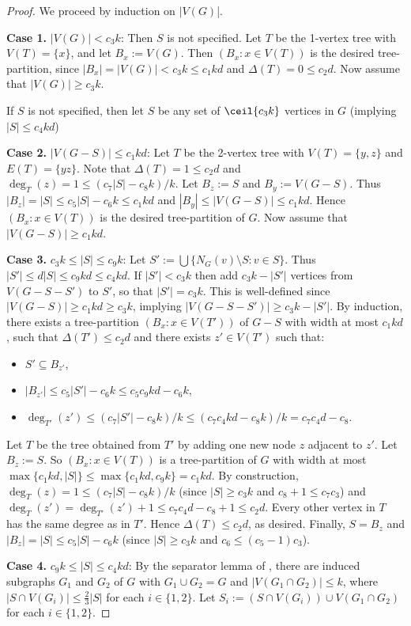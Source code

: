 \begin{proof}
We proceed by induction on $|V(G)$|.

\textbf{Case 1.} $|V(G)| < c_3 k$: Then $S$ is not specified. Let $T$ be the 1-vertex tree with $V(T)=\{x\}$, and let $B_x:=V(G)$. Then $(B_x:x\in V(T))$ is the desired tree-partition, since $|B_x|=|V(G)|<c_3 k \leq c_1 kd$ and $\Delta(T)=0\leq c_2d$. Now assume that $|V(G)| \geq c_3 k$. 

If $S$ is not specified, then let $S$ be any set of $\ceil{c_3k}$ vertices in $G$ (implying $|S|\leq c_4kd$)

\textbf{Case 2.} $|V(G-S)|\leq c_1kd$: Let $T$ be the 2-vertex tree with $V(T)=\{y,z\}$ and $E(T)=\{yz\}$. Note that $\Delta(T)=1\leq c_2 d$ and $\deg_T(z)=1\leq (c_7|S|-c_8k)/k$. Let $B_z:=S$ and $B_y:=V(G-S)$. Thus $|B_z|=|S|\leq c_5|S|-c_6k\leq c_1kd$ and $|B_y|\leq |V(G-S)|\leq c_1kd$. Hence $(B_x:x\in V(T))$ is the desired tree-partition of $G$. Now assume that $|V(G-S)|\geq c_1kd$.

\textbf{Case 3.} $c_3k \leq |S|\leq c_9 k$: Let $S':=\bigcup\{ N_G(v)\setminus S: v\in S\}$. Thus $|S'|\leq d |S|\leq c_9 kd\leq c_4kd$. If $|S'|< c_3 k$ then add $c_3k-|S'|$ vertices from $V(G-S-S')$ to $S'$, so that $|S'|=c_3k$. This is well-defined since 
$|V(G-S)| \geq c_1kd \geq c_3k$, implying $|V(G-S-S')| \geq c_3k-|S'|$.
By induction, there exists a tree-partition $(B_x:x\in V(T'))$ of $G-S$ with width at most $c_1 kd$, such that $\Delta(T')\leq c_2d$ and there exists $z'\in V(T')$ such that:
\begin{itemize}
    \item $S'\subseteq B_{z'}$, 
    \item $|B_{z'}|\leq c_5|S'|-c_6k \leq c_5c_9kd -c_6k$,
    \item $\deg_{T'}(z')\leq ( c_7 |S'| - c_8 k)/k \leq (c_7 c_4kd-c_8k)/k= c_7c_4d-c_8$.
\end{itemize}
Let $T$ be the tree obtained from $T'$ by adding one new node $z$ adjacent to $z'$. Let $B_z:=S$. So $(B_x:x\in V(T))$ is a tree-partition of $G$ with width at most $\max\{c_1kd,|S|\}\leq\max\{c_1kd,c_9k\}=c_1kd$. By construction, $\deg_T(z)=1 \leq ( c_7 |S| - c_8 k)/k$ (since $|S|\geq c_3k$ and $c_8+1 \leq c_7 c_3  $) and $\deg_{T}(z') = \deg_{T'}(z')+1\leq c_7 c_4d - c_8 + 1  \leq c_2d$. Every other vertex in $T$ has the same degree as in $T'$. Hence $\Delta(T)\leq c_2d$, as desired. Finally, $S=B_z$ and $|B_z|=|S| \leq c_5 |S|-c_6k$ (since $|S|\geq c_3k$ and $c_6 \leq (c_5-1) c_3$).

\textbf{Case 4.} $c_9 k \leq |S|\leq c_4kd$: By the separator lemma of \citet[(2.6)]{RS-II}, there are induced subgraphs $G_1$ and $G_2$ of $G$ with $G_1\cup G_2=G$ and $|V(G_1\cap G_2)|\leq k$, where $|S\cap V(G_i)|\leq \frac23 |S|$ for each $i\in\{1,2\}$. Let $S_i := (S\cap V(G_i))\cup V(G_1\cap G_2)$ for each $i\in\{1,2\}$.


\end{proof}
